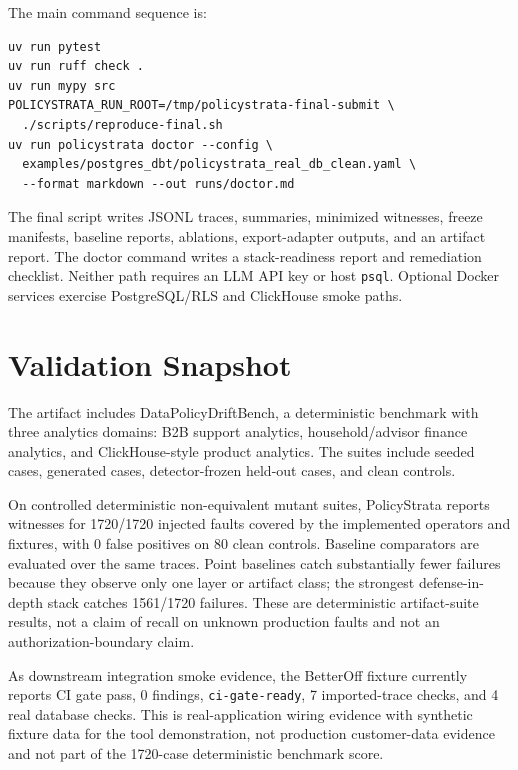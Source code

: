 \documentclass[sigconf]{acmart}
\begin{document}
The main command sequence is:

\begin{scriptsize}
\begin{verbatim}
uv run pytest
uv run ruff check .
uv run mypy src
POLICYSTRATA_RUN_ROOT=/tmp/policystrata-final-submit \
  ./scripts/reproduce-final.sh
uv run policystrata doctor --config \
  examples/postgres_dbt/policystrata_real_db_clean.yaml \
  --format markdown --out runs/doctor.md
\end{verbatim}
\end{scriptsize}

The final script writes JSONL traces, summaries, minimized witnesses, freeze manifests, baseline reports, ablations, export-adapter outputs, and an artifact report. The doctor command writes a stack-readiness report and remediation checklist. Neither path requires an LLM API key or host \texttt{psql}. Optional Docker services exercise PostgreSQL/RLS and ClickHouse smoke paths.

\section{Validation Snapshot}

The artifact includes DataPolicyDriftBench, a deterministic benchmark with three analytics domains: B2B support analytics, household/advisor finance analytics, and ClickHouse-style product analytics. The suites include seeded cases, generated cases, detector-frozen held-out cases, and clean controls.

On controlled deterministic non-equivalent mutant suites, PolicyStrata reports witnesses for 1720/1720 injected faults covered by the implemented operators and fixtures, with 0 false positives on 80 clean controls. Baseline comparators are evaluated over the same traces. Point baselines catch substantially fewer failures because they observe only one layer or artifact class; the strongest defense-in-depth stack catches 1561/1720 failures. These are deterministic artifact-suite results, not a claim of recall on unknown production faults and not an authorization-boundary claim.

As downstream integration smoke evidence, the BetterOff fixture currently reports CI gate pass, 0 findings, \texttt{ci-gate-ready}, 7 imported-trace checks, and 4 real database checks. This is real-application wiring evidence with synthetic fixture data for the tool demonstration, not production customer-data evidence and not part of the 1720-case deterministic benchmark score.
\end{document}
